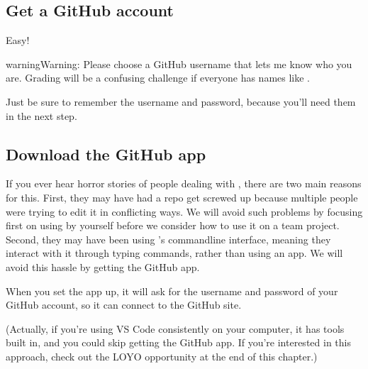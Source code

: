 \documentclass[letterpaper,10pt,english]{jupyterBook}
\begin{document}
\subsection{Get a GitHub account}
\label{\detokenize{chapter-8-version-control:get-a-github-account}}
\sphinxAtStartPar
{}  Easy!

\begin{sphinxadmonition}{warning}{Warning:}
\sphinxAtStartPar
Please choose a GitHub username that lets me know who you are.  Grading will be a confusing challenge if everyone has names like .
\end{sphinxadmonition}

\sphinxAtStartPar
Just be sure to remember the username and password, because you’ll need them in the next step.


\subsection{Download the GitHub app}
\label{\detokenize{chapter-8-version-control:download-the-github-app}}
\sphinxAtStartPar
If you ever hear horror stories of people dealing with , there are two main reasons for this.  First, they may have had a repo get screwed up because multiple people were trying to edit it in conflicting ways.  We will avoid such problems by focusing first on using  by yourself before we consider how to use it on a team project.  Second, they may have been using ’s command\sphinxhyphen{}line interface, meaning they interact with it through typing commands, rather than using an app.  We will avoid this hassle by getting the GitHub app.

\sphinxAtStartPar
{}

\sphinxAtStartPar
When you set the app up, it will ask for the username and password of your GitHub account, so it can connect to the GitHub site.

\sphinxAtStartPar
(Actually, if you’re using VS Code consistently on your computer, it has  tools built in, and you could skip getting the GitHub app.  If you’re interested in this approach, check out the LOYO opportunity at the end of this chapter.)
\end{document}

